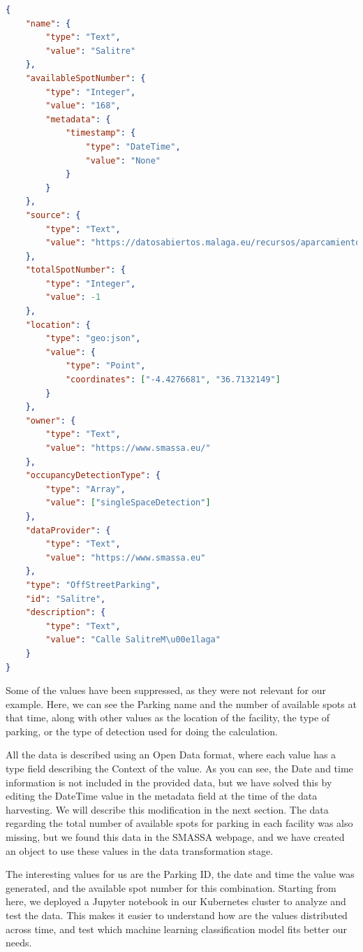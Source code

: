 \begin{lstlisting}[language=json, caption=Example of a NGSI JSON object fetched from the Málaga Town Hall Open Data Portal.]
{ 
    "name": {
        "type": "Text", 
        "value": "Salitre"
    }, 
    "availableSpotNumber": {
        "type": "Integer", 
        "value": "168", 
        "metadata": {
            "timestamp": {
                "type": "DateTime", 
                "value": "None"
            }
        }
    }, 
    "source": {
        "type": "Text", 
        "value": "https://datosabiertos.malaga.eu/recursos/aparcamientos/ocupappublicosmun/ocupappublicosmunfiware.json"
    }, 
    "totalSpotNumber": {
        "type": "Integer", 
        "value": -1
    }, 
    "location": {
        "type": "geo:json", 
        "value": {
            "type": "Point", 
            "coordinates": ["-4.4276681", "36.7132149"]
        }
    },  
    "owner": {
        "type": "Text", 
        "value": "https://www.smassa.eu/"
    }, 
    "occupancyDetectionType": {
        "type": "Array", 
        "value": ["singleSpaceDetection"]
    }, 
    "dataProvider": {
        "type": "Text", 
        "value": "https://www.smassa.eu"
    }, 
    "type": "OffStreetParking", 
    "id": "Salitre", 
    "description": {
        "type": "Text", 
        "value": "Calle SalitreM\u00e1laga"
    }
}
\end{lstlisting}

Some of the values have been suppressed, as they were not relevant for our example. Here, we can see the Parking name and the number of available spots at that time, along with other values as the location of the facility, the type of parking, or the type of detection used for doing the calculation. 

All the data is described using an Open Data format, where each value has a type field describing the Context of the value. As you can see, the Date and time information is not included in the provided data, but we have solved this by editing the DateTime value in the metadata field at the time of the data harvesting. We will describe this modification in the next section. The data regarding the total number of available spots for parking in each facility was also missing, but we found this data in the SMASSA webpage, and we have created an object to use these values in the data transformation stage. 

The interesting values for us are the Parking ID, the date and time the value was generated, and the available spot number for this combination. Starting from here, we deployed a Jupyter notebook in our Kubernetes cluster to analyze and test the data. This makes it easier to understand how are the values distributed across time, and test which machine learning classification model fits better our needs. 

